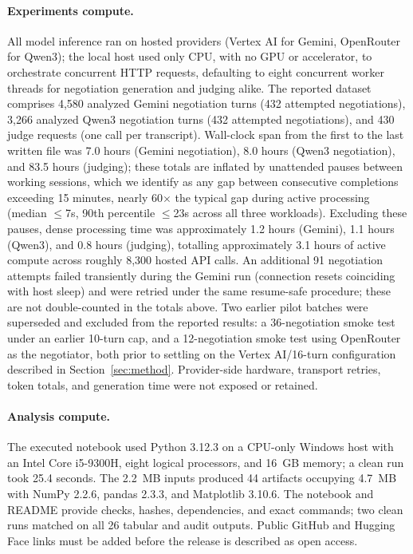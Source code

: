 \documentclass{article}
\begin{document}
\paragraph{Experiments compute.}
All model inference ran on hosted providers (Vertex AI for Gemini, OpenRouter
for Qwen3); the local host used only CPU, with no GPU or accelerator, to
orchestrate concurrent HTTP requests, defaulting to eight concurrent worker
threads for negotiation generation and judging alike. The reported dataset
comprises 4,580 analyzed Gemini negotiation turns (432 attempted
negotiations), 3,266 analyzed Qwen3 negotiation turns (432 attempted
negotiations), and 430 judge requests (one call per transcript). Wall-clock
span from the first to the last written file was 7.0 hours (Gemini
negotiation), 8.0 hours (Qwen3 negotiation), and 83.5 hours (judging); these
totals are inflated by unattended pauses between working sessions, which we
identify as any gap between consecutive completions exceeding 15 minutes,
nearly 60$\times$ the typical gap during active processing (median
$\le$7s, 90th percentile $\le$23s across all three workloads). Excluding
these pauses, dense processing time was approximately 1.2 hours (Gemini),
1.1 hours (Qwen3), and 0.8 hours (judging), totalling approximately 3.1
hours of active compute across roughly 8,300 hosted API calls. An
additional 91 negotiation attempts failed transiently during the Gemini run
(connection resets coinciding with host sleep) and were retried under the
same resume-safe procedure; these are not double-counted in the totals
above. Two earlier pilot batches were superseded and excluded from the
reported results: a 36-negotiation smoke test under an earlier 10-turn cap,
and a 12-negotiation smoke test using OpenRouter as the negotiator, both
prior to settling on the Vertex AI/16-turn configuration described in
Section~\ref{sec:method}. Provider-side hardware, transport retries, token
totals, and generation time were not exposed or retained.



\paragraph{Analysis compute.}
The executed notebook used Python 3.12.3 on a CPU-only Windows host with an
Intel Core i5-9300H, eight logical processors, and 16~GB memory; a clean run
took 25.4 seconds. The 2.2~MB inputs produced 44 artifacts occupying 4.7~MB
with NumPy 2.2.6, pandas 2.3.3, and Matplotlib 3.10.6. The notebook and README
provide checks, hashes, dependencies, and exact commands; two clean runs
matched on all 26 tabular and audit outputs. Public GitHub and Hugging Face
links must be added before the release is described as open access.
\end{document}
